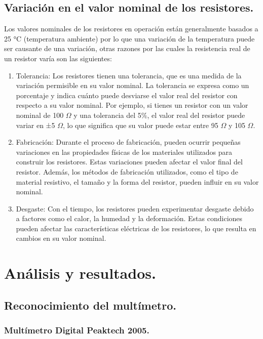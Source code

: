 \documentclass[10pt]{article}
\begin{document}
\begin{multicols}{2}
\subsection{Variación en el valor nominal de los resistores.}

Los valores nominales de los resistores en operación están generalmente basados a 25 °C (temperatura ambiente) por lo que una variación de la temperatura puede ser causante de una variación, otras razones por las cuales la resistencia real de un resistor varía son las siguientes:
\begin{enumerate}
	\item Tolerancia: Los resistores tienen una tolerancia, que es una medida de la variación permisible en su valor nominal. La tolerancia se expresa como un porcentaje y indica cuánto puede desviarse el valor real del resistor con respecto a su valor nominal. Por ejemplo, si tienes un resistor con un valor nominal de 100 $\Omega$ y una tolerancia del 5$\%$, el valor real del resistor puede variar en ±5 $\Omega$, lo que significa que su valor puede estar entre 95 $\Omega$ y 105 $\Omega$.
	\item Fabricación: Durante el proceso de fabricación, pueden ocurrir pequeñas variaciones en las propiedades físicas de los materiales utilizados para construir los resistores. Estas variaciones pueden afectar el valor final del resistor. Además, los métodos de fabricación utilizados, como el tipo de material resistivo, el tamaño y la forma del resistor, pueden influir en su valor nominal.
	\item Desgaste: Con el tiempo, los resistores pueden experimentar desgaste debido a factores como el calor, la humedad y la deformación. Estas condiciones pueden afectar las características eléctricas de los resistores, lo que resulta en cambios en su valor nominal.
\end{enumerate}


\section{Análisis y resultados.}

\subsection{Reconocimiento del multímetro.}

\subsubsection{Multímetro Digital Peaktech 2005.}


\end{multicols}
\end{document}
